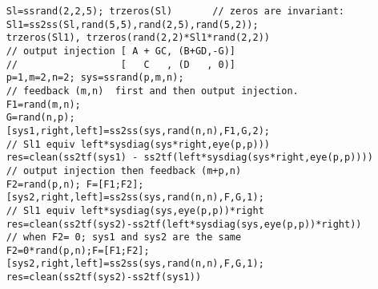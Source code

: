 \begin{examples}
  \begin{Verbatim}
    Sl=ssrand(2,2,5); trzeros(Sl)       // zeros are invariant:
    Sl1=ss2ss(Sl,rand(5,5),rand(2,5),rand(5,2)); 
    trzeros(Sl1), trzeros(rand(2,2)*Sl1*rand(2,2))
    // output injection [ A + GC, (B+GD,-G)]
    //                  [   C   , (D   , 0)]
    p=1,m=2,n=2; sys=ssrand(p,m,n);
    // feedback (m,n)  first and then output injection.
    F1=rand(m,n);
    G=rand(n,p);
    [sys1,right,left]=ss2ss(sys,rand(n,n),F1,G,2);
    // Sl1 equiv left*sysdiag(sys*right,eye(p,p)))
    res=clean(ss2tf(sys1) - ss2tf(left*sysdiag(sys*right,eye(p,p))))
    // output injection then feedback (m+p,n) 
    F2=rand(p,n); F=[F1;F2];
    [sys2,right,left]=ss2ss(sys,rand(n,n),F,G,1);
    // Sl1 equiv left*sysdiag(sys,eye(p,p))*right 
    res=clean(ss2tf(sys2)-ss2tf(left*sysdiag(sys,eye(p,p))*right))
    // when F2= 0; sys1 and sys2 are the same 
    F2=0*rand(p,n);F=[F1;F2];
    [sys2,right,left]=ss2ss(sys,rand(n,n),F,G,1);
    res=clean(ss2tf(sys2)-ss2tf(sys1))
  \end{Verbatim}
\end{examples}
\begin{manseealso}
     
\end{manseealso}
